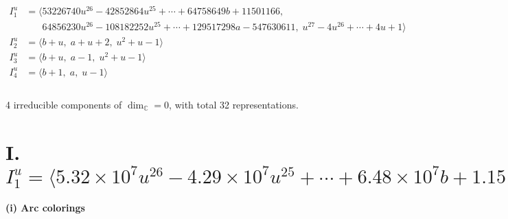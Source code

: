 \documentclass[1p]{elsarticle_modified}
\theoremstyle{definition}
\begin{document}
\begin{align*}
I^u_{1}&=\langle 
53226740 u^{26}-42852864 u^{25}+\cdots+64758649 b+11501166,\\
\phantom{I^u_{1}}&\phantom{= \langle  }64856230 u^{26}-108182252 u^{25}+\cdots+129517298 a-547630611,\;u^{27}-4 u^{26}+\cdots+4 u+1\rangle \\
I^u_{2}&=\langle 
b+u,\;a+u+2,\;u^2+u-1\rangle \\
I^u_{3}&=\langle 
b+u,\;a-1,\;u^2+u-1\rangle \\
I^u_{4}&=\langle 
b+1,\;a,\;u-1\rangle \\
\\
\end{align*}
\raggedright * 4 irreducible components of $\dim_{\mathbb{C}}=0$, with total 32 representations.\\
\newpage
\renewcommand{\arraystretch}{1}
\centering \section*{I. $I^u_{1}= \langle 5.32\times10^{7} u^{26}-4.29\times10^{7} u^{25}+\cdots+6.48\times10^{7} b+1.15\times10^{7},\;6.49\times10^{7} u^{26}-1.08\times10^{8} u^{25}+\cdots+1.30\times10^{8} a-5.48\times10^{8},\;u^{27}-4 u^{26}+\cdots+4 u+1 \rangle$}
\flushleft \textbf{(i) Arc colorings}\\
\end{document}
